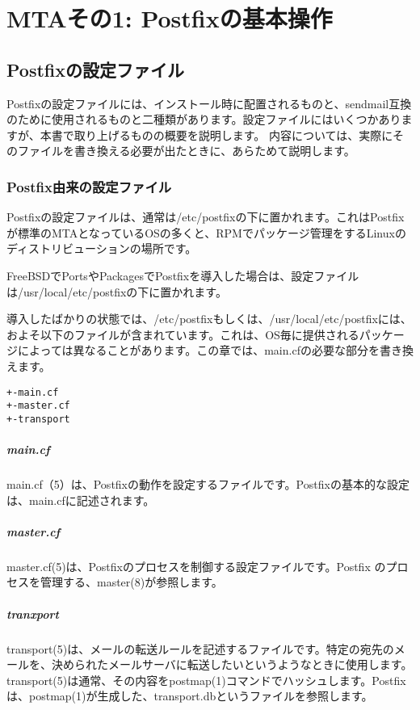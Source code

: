 \chapter{MTAその1: Postfixの基本操作}

\section{Postfixの設定ファイル}
Postfixの設定ファイルには、インストール時に配置されるものと、sendmail互換のために使用されるものと二種類があります。設定ファイルにはいくつかありますが、本書で取り上げるものの概要を説明します。
内容については、実際にそのファイルを書き換える必要が出たときに、あらためて説明します。

\subsection{Postfix由来の設定ファイル}

Postfixの設定ファイルは、通常は/etc/postfixの下に置かれます。これはPostfixが標準のMTAとなっているOSの多くと、RPMでパッケージ管理をするLinuxのディストリビューションの場所です。

FreeBSDでPortsやPackagesでPostfixを導入した場合は、設定ファイルは/usr/local/etc/postfixの下に置かれます。

導入したばかりの状態では、/etc/postfixもしくは、/usr/local/etc/postfixには、およそ以下のファイルが含まれています。これは、OS毎に提供されるパッケージによっては異なることがあります。この章では、main.cfの必要な部分を書き換えます。

\begin{lstlisting}[basicstyle=\ttfamily\footnotesize, frame=single]
+-main.cf
+-master.cf
+-transport
\end{lstlisting}

\paragraph{main.cf}
main.cf（5）は、Postfixの動作を設定するファイルです。Postfixの基本的な設定は、main.cfに記述されます。

\paragraph{master.cf}
master.cf(5)は、Postfixのプロセスを制御する設定ファイルです。Postfix
のプロセスを管理する、master(8)が参照します。

\paragraph{tranxport}
transport(5)は、メールの転送ルールを記述するファイルです。特定の宛先のメールを、決められたメールサーバに転送したいというようなときに使用します。
transport(5)は通常、その内容をpostmap(1)コマンドでハッシュします。Postfixは、postmap(1)が生成した、transport.dbというファイルを参照します。


